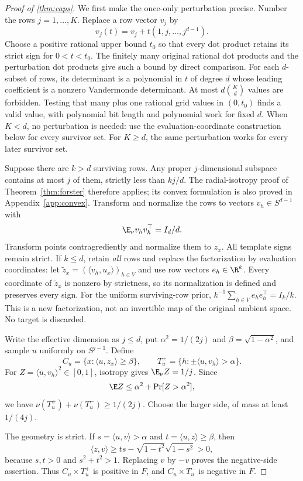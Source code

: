 \begin{proof}[Proof of \cref{thm:caps}]
We first make the once-only perturbation precise. Number the rows $j=1,\ldots,K$. Replace a row vector $v_j$ by
\[
 v_j(t)=v_j+t(1,j,\ldots,j^{d-1}).
\]
Choose a positive rational upper bound $t_0$ so that every dot product retains its strict sign for $0<t<t_0$. The finitely many original rational dot products and the perturbation dot products give such a bound by direct comparison. For each $d$-subset of rows, its determinant is a polynomial in $t$ of degree $d$ whose leading coefficient is a nonzero Vandermonde determinant. At most $d\binom Kd$ values are forbidden. Testing that many plus one rational grid values in $(0,t_0)$ finds a valid value, with polynomial bit length and polynomial work for fixed $d$. When $K<d$, no perturbation is needed: use the evaluation-coordinate construction below for every survivor set. For $K\ge d$, the same perturbation works for every later survivor set.

Suppose there are $k>d$ surviving rows. Any proper $j$-dimensional subspace contains at most $j$ of them, strictly less than $kj/d$. The radial-isotropy proof of Theorem~\ref{thm:forster} therefore applies; its convex formulation is also proved in Appendix~\ref{app:convex}. Transform and normalize the rows to vectors $v_h\in S^{d-1}$ with
\[
 \E_\nu v_hv_h^\top=I_d/d.
\]
Transform points contragrediently and normalize them to $z_x$. All template signs remain strict. If $k\le d$, retain \emph{all} rows and replace the factorization by evaluation coordinates: let $\widetilde z_x=(\langle v_h,u_x\rangle)_{h\in V}$ and use row vectors $e_h\in\R^k$. Every coordinate of $\widetilde z_x$ is nonzero by strictness, so its normalization is defined and preserves every sign. For the uniform surviving-row prior, $k^{-1}\sum_{h\in V}e_he_h^\top=I_k/k$. This is a new factorization, not an invertible map of the original ambient space. No target is discarded.

Write the effective dimension as $j\le d$, put $\alpha^2=1/(2j)$ and $\beta=\sqrt{1-\alpha^2}$, and sample $u$ uniformly on $S^{j-1}$. Define
\[
 C_u=\{x:\langle u,z_x\rangle\ge\beta\},\qquad
 T_u^\pm=\{h:\pm\langle u,v_h\rangle>\alpha\}.
\]
For $Z=\langle u,v_h\rangle^2\in[0,1]$, isotropy gives $\E_\nu Z=1/j$. Since
\[
 \E Z\le\alpha^2+\Pr[Z>\alpha^2],
\]
we have $\nu(T_u^+)+\nu(T_u^-)\ge1/(2j)$. Choose the larger side, of mass at least $1/(4j)$.

The geometry is strict. If $s=\langle u,v\rangle>\alpha$ and $t=\langle u,z\rangle\ge\beta$, then
\[
 \langle z,v\rangle\ge ts-\sqrt{1-t^2}\sqrt{1-s^2}>0,
\]
because $s,t>0$ and $s^2+t^2>1$. Replacing $v$ by $-v$ proves the negative-side assertion. Thus $C_u\times T_u^+$ is positive in $F$, and $C_u\times T_u^-$ is negative in $F$.


\end{proof}
